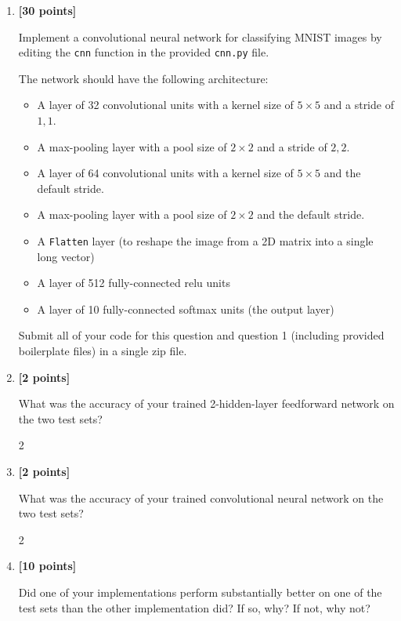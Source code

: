 \documentclass{article}
\newcounter{totalpoints}
\newcommand{\points}[1]{{\addtocounter{totalpoints}{#1}\textbf{[#1 points]}}}
\begin{document}
\begin{enumerate}
\begin{enumerate}
\item\points{30}
Implement a convolutional neural network for classifying MNIST images by editing the \verb|cnn| function in the provided \texttt{cnn.py} file.

The network should have the following architecture:
\begin{itemize}
    \item A layer of 32 convolutional units with a kernel size of $5\times5$ and a stride of $1,1$.
    \item A max-pooling layer with a pool size of $2\times2$ and a stride of $2,2$.
    \item A layer of 64 convolutional units with a kernel size of $5\times5$ and the default stride.
    \item A max-pooling layer with a pool size of $2\times2$ and the default stride.
    \item A \verb|Flatten| layer (to reshape the image from a 2D matrix into a single long vector)
    \item A layer of 512 fully-connected relu units
    \item A layer of 10 fully-connected softmax units (the output layer)
\end{itemize}

Submit all of your code for this question and question 1 (including provided boilerplate files) in a single zip file.

\item \points{2}
What was the accuracy of your trained 2-hidden-layer feedforward network on the two test sets?
\begin{answer}{2\baselineskip}
\end{answer}

\item \points{2}
What was the accuracy of your trained convolutional neural network on the two test sets?
\begin{answer}{2\baselineskip}
\end{answer}

\item \points{10}
Did one of your implementations perform substantially better on one of the test sets than the other implementation did?
If so, why?  If not, why not?
\begin{answer}{1.5in}
\end{answer}


\end{enumerate}


\end{enumerate}
\end{document}
